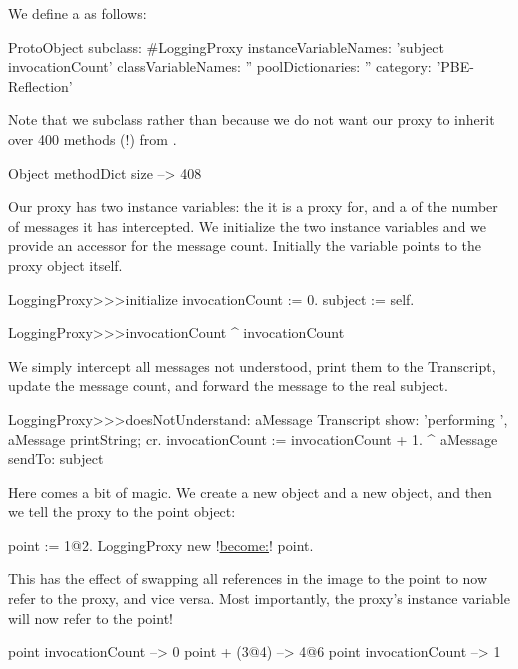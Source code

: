 \documentclass[a4paper,10pt,twoside]{book}
\begin{document}
We define a  as follows:
\begin{code}{}
ProtoObject subclass: #LoggingProxy
	instanceVariableNames: 'subject invocationCount'
	classVariableNames: ''
	poolDictionaries: ''
	category: 'PBE-Reflection'
\end{code}
Note that we subclass  rather than  because we do not want our proxy to inherit over 400 methods (!) from .

\begin{code}{}
Object methodDict size --> 408
\end{code}

Our proxy has two instance variables: the  it is a proxy for, and a  of the number of messages it has intercepted.
We initialize the two instance variables and we provide an accessor for the message count.
Initially the  variable points to the proxy object itself.
\begin{code}{}
LoggingProxy>>>initialize
	invocationCount := 0.
	subject := self.
\end{code}

\begin{code}{}
LoggingProxy>>>invocationCount
	^ invocationCount
\end{code}

We simply intercept all messages not understood, print them to the Transcript, update the message count, and forward the message to the real subject.
\begin{code}{}
LoggingProxy>>>doesNotUnderstand: aMessage 
	Transcript show: 'performing ', aMessage printString; cr.
	invocationCount := invocationCount + 1.
	^ aMessage sendTo: subject
\end{code}

Here comes a bit of magic.
We create a new  object and a new  object, and then we tell the proxy to  the point object:
\begin{code}{}
point := 1@2.
LoggingProxy new !\underline{become:}! point.
\end{code}

This has the effect of swapping all references in the image to the point to now refer to the proxy, and vice versa. Most importantly, the proxy's  instance variable will now refer to the point!

\begin{code}{}
point invocationCount --> 0
point + (3@4)             --> 4@6
point invocationCount --> 1
\end{code}
\end{document}
